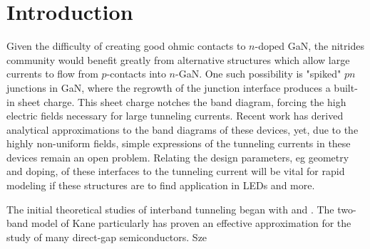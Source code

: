 \section{Introduction}
Given the difficulty of creating good ohmic contacts to $n$-doped GaN, the nitrides community would benefit greatly from alternative structures which allow large currents to flow from $p$-contacts into $n$-GaN.  One such possibility is "spiked" $pn$ junctions in GaN, where the regrowth of the junction interface produces a built-in sheet charge.  This sheet charge notches the band diagram, forcing the high electric fields necessary for large tunneling currents.  Recent work has derived analytical approximations to the band diagrams of these devices, yet, due to the highly non-uniform fields, simple expressions of the tunneling currents in these devices remain an open problem.  Relating the design parameters, eg geometry and doping, of these interfaces to the tunneling current will be vital for rapid modeling if these structures are to find application in LEDs and more.

The initial theoretical studies of interband tunneling began with \cite{Keldysh_1958} and \cite{Kane_1960}.  The two-band model of Kane particularly has proven an effective approximation for the study of many direct-gap semiconductors.  Sze 